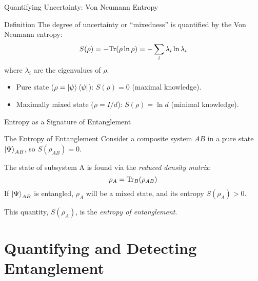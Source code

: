 \begin{frame}{Quantifying Uncertainty: Von Neumann Entropy}
  \begin{block}{Definition}
    The degree of uncertainty or ``mixedness'' is quantified by the Von
    Neumann entropy:
    \begin{equation}
      S(\rho) = - \mathrm{Tr}(\rho \ln \rho) = - \sum_i \lambda_i \ln \lambda_i
    \end{equation}
    where $\lambda_i$ are the eigenvalues of $\rho$.
    \begin{itemize}[<+->]
      \item Pure state ($\rho = \ket{\psi}\bra{\psi}$): $S(\rho) = 0$
        (maximal knowledge).
      \item Maximally mixed state ($\rho=I/d$): $S(\rho) = \ln d$
        (minimal knowledge).
    \end{itemize}
  \end{block}
\end{frame}

\begin{frame}{Entropy as a Signature of Entanglement}
  \begin{alertblock}{The Entropy of Entanglement}
    Consider a composite system $AB$ in a pure state $\ket{\Psi}_{AB}$, so
    $S(\rho_{AB})=0$.
    \pause

    The state of subsystem A is found via the \emph{reduced density matrix}:
    \[ \rho_A = \mathrm{Tr}_B(\rho_{AB}) \]
    \pause
    If $\ket{\Psi}_{AB}$ is entangled, $\rho_A$ will be a mixed state, and its
    entropy \alert{$S(\rho_A) > 0$}.
    \pause

    This quantity, $S(\rho_A)$, is the \emph{entropy of entanglement}.
  \end{alertblock}
\end{frame}

\section{Quantifying and Detecting Entanglement}


